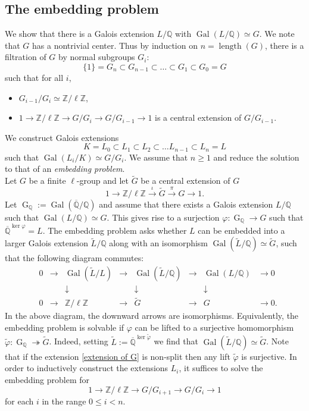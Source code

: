 \documentclass[11pt,reqno]{amsart}
\newcommand{\Z}{\mathbb{Z}}
\newcommand{\Q}{\mathbb{Q}}
\newcommand{\op}[1]{\operatorname{#1}}
\numberwithin{equation}{section}
\begin{document}
\subsection{The embedding problem}
We show that there is a Galois extension $L/\Q$ with $\op{Gal}(L/\Q)\simeq G$. We note that $G$ has a nontrivial center. Thus by induction on $n=\op{length}(G)$, there is a filtration of $G$ by normal subgroups $G_i$:
\begin{equation}\label{filtration on G}\{1\}=G_n\subset G_{n-1}\subset \dots \subset G_{1}\subset G_0=G\end{equation} such that for all $i$,
\begin{itemize}
    \item $G_{i-1}/G_{i}\simeq \Z/\ell\Z$,
    \item $1\to \Z/\ell\Z\to G/G_i\to G/G_{i-1}\to 1$ is a central extension of $G/G_{i-1}$. 
\end{itemize}
 We construct Galois extensions
\[K=L_0\subset L_1\subset L_2\subset \dots L_{n-1}\subset L_n=L\] such that $\op{Gal}(L_i/K)\simeq G/G_i$. We assume that $n\geq 1$ and reduce the solution to that of an \emph{embedding problem}.\\ 

Let $G$ be a finite $\ell$-group and let $\widetilde{G}$ be a central extension of $G$
\begin{equation}\label{extension of G}1\to \Z/\ell\Z\xrightarrow{\iota} \widetilde{G} \xrightarrow{\pi} G\rightarrow 1.\end{equation} Let $\op{G}_{\Q}:=\op{Gal}(\overline{\Q}/\Q)$ and assume that there exists a Galois extension $L/\Q$ such that ${\op{Gal}(L/\Q)\simeq G}$. This gives rise to a surjection $\varphi:\op{G}_{\Q}\rightarrow G$ such that $\overline{\Q}^{\op{ker}\varphi}=L$. The embedding problem asks whether $L$ can be embedded into a larger Galois extension $\widetilde{L}/\Q$ along with an isomorphism $\op{Gal}(\widetilde{L}/\Q)\simeq \widetilde{G}$, such that the following diagram commutes:
\[
\begin{array}{ccccccccc}
 & 0 & \to & \op{Gal}(\widetilde{L}/L) & \to & \op{Gal}(\widetilde{L}/\Q) & \to & \op{Gal}(L/\Q) & \to 0 \\
 &   &     & \downarrow &   & \downarrow &   & \downarrow &  \\
 & 0 & \to & \Z/\ell \Z  & \to & \widetilde{G}  & \to & G  & \to 0.
\end{array}
\]
In the above diagram, the downward arrows are isomorphisms. Equivalently, the embedding problem is solvable if $\varphi$ can be lifted to a surjective homomorphism $\widetilde{\varphi}: \op{G}_\Q\twoheadrightarrow \widetilde{G}$. Indeed, setting $\widetilde{L}:=\overline{\Q}^{\op{ker}\widetilde{\varphi}}$ we find that $\op{Gal}(\widetilde{L}/\Q)\simeq \widetilde{G}$. Note that if the extension \eqref{extension of G} is non-split then any lift $\widetilde{\varphi}$ is surjective. In order to inductively construct the extensions $L_i$, it suffices to solve the embedding problem for 
\[1\rightarrow \Z/\ell \Z\rightarrow G/G_{i+1}\rightarrow G/G_i\rightarrow 1\] for each $i$ in the range $0\leq i <n$. \\
\end{document}
